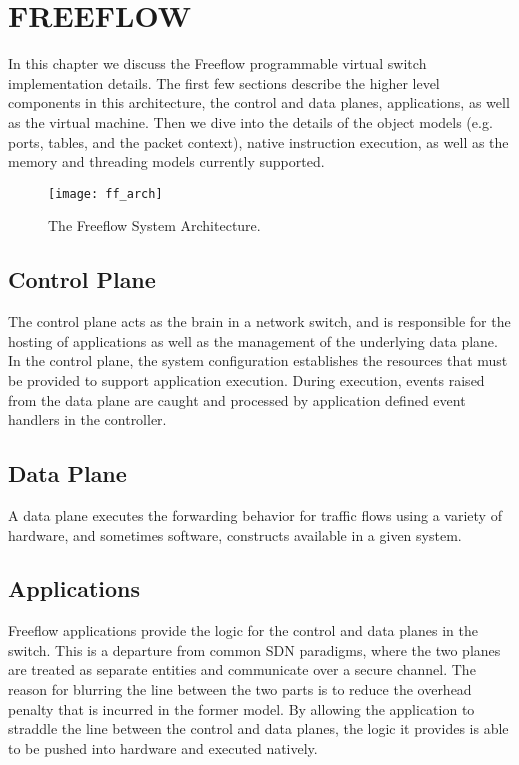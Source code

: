 \chapter{FREEFLOW}
\label{ff}
In this chapter we discuss the Freeflow programmable virtual switch
implementation details. The first few sections describe the higher level
components in this architecture, the control and data planes, applications, as
well as the virtual machine. Then we dive into the details of the object
models (e.g. ports, tables, and the packet context), native instruction
execution, as well as the memory and threading models currently supported.

\begin{figure}[h]
\centering
\texttt{[image: ff\_arch]}
\caption{The Freeflow System Architecture.}
\label{ff_arch}
\end{figure}

\section{Control Plane}
\label{ff:cp}
The control plane acts as the brain in a network switch, and is responsible for
the hosting of applications as well as the management of the underlying data
plane. In the control plane, the system configuration establishes the resources
that must be provided to support application execution. During execution,
events raised from the data plane are caught and processed by application
defined event handlers in the controller.

\section{Data Plane}
\label{ff:dp}
A data plane executes the forwarding behavior for traffic flows using a variety
of hardware, and sometimes software, constructs available in a given system.

\section{Applications}
\label{ff:app}
Freeflow applications provide the logic for the control and data planes in the
switch. This is a departure from common SDN paradigms, where the two planes are
treated as separate entities and communicate over a secure channel. The reason
for blurring the line between the two parts is to reduce the overhead penalty
that is incurred in the former model. By allowing the application to straddle
the line between the control and data planes, the logic it provides is able
to be pushed into hardware and executed natively.

